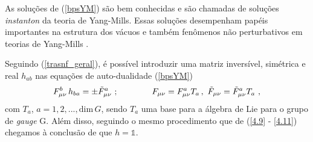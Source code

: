 As soluções de (\ref{bpsYM}) são bem conhecidas e são chamadas de soluções \textit{instanton} da teoria de Yang-Mills. Essas soluções desempenham papéis importantes na estrutura dos vácuos e também fenômenos não perturbativos em teorias de Yang-Mills \cite{TopSol, YMpseudoparticle}.

Seguindo (\ref{trasnf_geral}), é possível introduzir uma matriz inversível, simétrica e real $h_{ab}$ nas equações de auto-dualidade (\ref{bpsYM})
\begin{equation}
    F_{\mu\nu}^b \, h_{ba} = \pm \Tilde{F}^{a}_{\mu\nu} \ ; \qquad\qquad F_{\mu\nu} = F^{a}_{\mu\nu} T_a \, , \ \Tilde{F}_{\mu\nu} = \Tilde{F}^{a}_{\mu\nu} T_a \ ,
\end{equation}
com $T_a$, $a=1,2,..., \text{dim}\, G$, sendo $T_a$ uma base para a álgebra de Lie para o grupo de \textit{gauge} G. Além disso, seguindo o mesmo procedimento que de (\ref{4.9} - \ref{4.11}) chegamos à conclusão de que $h = \mathbb{1}$.
